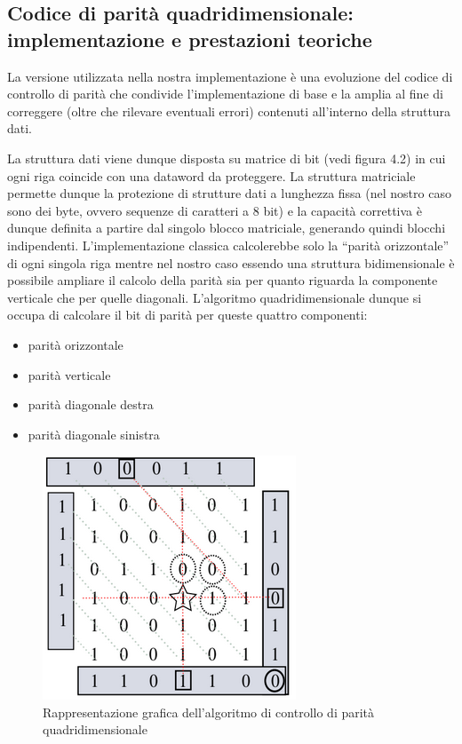 \documentclass[LaM,binding=0.6cm]{../sapthesis}
\begin{document}
\subsection{Codice di parità quadridimensionale: implementazione e prestazioni teoriche}

La versione utilizzata nella nostra implementazione è una evoluzione del codice di controllo di parità che condivide l’implementazione di base e la amplia al fine di correggere (oltre che rilevare eventuali errori) contenuti all’interno della struttura dati.

La struttura dati viene dunque disposta su matrice di bit (vedi figura 4.2) in cui ogni riga coincide con una dataword da proteggere.
La struttura matriciale permette dunque la protezione di strutture dati a lunghezza fissa (nel nostro caso sono dei byte, ovvero sequenze di caratteri a 8 bit) e la capacità correttiva è dunque definita a partire dal singolo blocco matriciale, generando quindi blocchi indipendenti.
L’implementazione classica calcolerebbe solo la “parità orizzontale” di ogni singola riga mentre nel nostro caso essendo una struttura bidimensionale è possibile ampliare il calcolo della parità sia per quanto riguarda la componente verticale che per quelle diagonali.
L’algoritmo quadridimensionale dunque si occupa di calcolare il bit di parità per queste quattro componenti:
\begin{itemize}
    \item parità orizzontale
    \item parità verticale
    \item parità diagonale destra
    \item parità diagonale sinistra
\end{itemize}

\begin{figure}[htbp]
\centerline{\includegraphics[scale=0.9]{examples/parita4D.PNG}}
\caption{Rappresentazione grafica dell'algoritmo di controllo di parità quadridimensionale}
\label{fig}
\end{figure}
\newline
\end{document}
